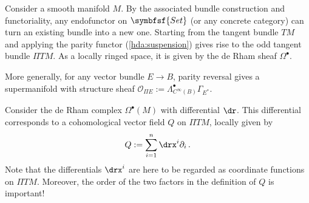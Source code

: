     \begin{example}\label{hdg:odd_tangent_bundle}
        Consider a smooth manifold $M$. By the associated bundle construction and functoriality, any endofunctor on $\symbfsf{Set}$ (or any concrete category) can turn an existing bundle into a new one. Starting from the tangent bundle $TM$ and applying the parity functor (\cref{hda:suspension}) gives rise to the odd tangent bundle $\Pi TM$. As a locally ringed space, it is given by the de Rham sheaf $\Omega^\bullet$.

        More generally, for any vector bundle $E\rightarrow B$, parity reversal gives a supermanifold with structure sheaf $\mathcal{O}_{\Pi E}:=\Lambda^\bullet_{C^\infty(B)}\Gamma_{E^*}$.
    \end{example}


    \begin{example}
        Consider the de Rham complex $\Omega^\bullet(M)$ with differential $\dr$. This differential corresponds to a cohomological vector field $Q$ on $\Pi TM$, locally given by
        \begin{gather}
            Q := \sum_{i=1}^n\drx^i\partial_i\,.
        \end{gather}
        Note that the differentials $\drx^i$ are here to be regarded as coordinate functions on $\Pi TM$. Moreover, the order of the two factors in the definition of $Q$ is important!
    \end{example}



